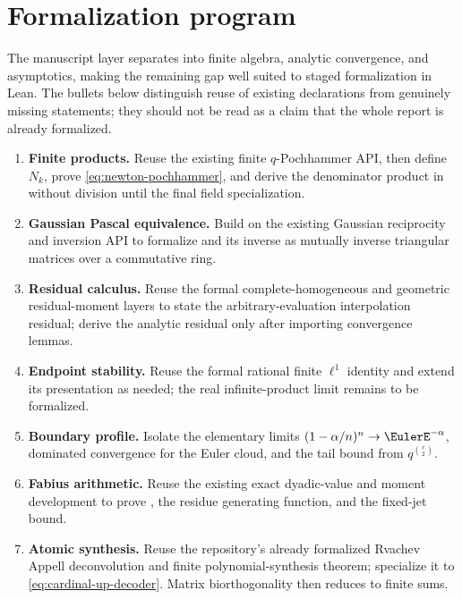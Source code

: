 \documentclass[11pt,oneside]{book}
\numberwithin{equation}{chapter}
\theoremstyle{definition}
\theoremstyle{remark}
\begin{document}
\section{Formalization program}
\label{sec:formalization-program}

The manuscript layer separates into finite algebra, analytic convergence,
and asymptotics, making the remaining gap well suited to staged
formalization in Lean.  The bullets below distinguish reuse of existing
declarations from genuinely missing statements; they should not be read as
a claim that the whole report is already formalized.

\begin{enumerate}
\item \textbf{Finite products.}  Reuse the existing finite $q$-Pochhammer
      API, then define $N_k$, prove
      \eqref{eq:newton-pochhammer}, and derive the denominator product in
       without division until the final
      field specialization.
\item \textbf{Gaussian Pascal equivalence.}  Build on the existing Gaussian
      reciprocity and inversion API to formalize
       and its inverse as mutually inverse
      triangular matrices over a commutative ring.
\item \textbf{Residual calculus.}  Reuse the formal complete-homogeneous and
      geometric residual-moment layers to state the arbitrary-evaluation
      interpolation residual; derive the analytic residual only after
      importing convergence lemmas.
\item \textbf{Endpoint stability.}  Reuse the formal rational finite
      $\ell^1$ identity and extend its presentation as needed; the real
      infinite-product limit remains to be formalized.
\item \textbf{Boundary profile.}  Isolate the elementary limits
      $(1-\alpha/n)^n\to\EulerE^{-\alpha}$, dominated convergence for the Euler
      cloud, and the tail bound from $q^{\binom r2}$.
\item \textbf{Fabius arithmetic.}  Reuse the existing exact dyadic-value and
      moment development to prove , the
      residue generating function, and the fixed-jet bound.
\item \textbf{Atomic synthesis.}  Reuse the repository's already formalized
      Rvachev Appell deconvolution and finite polynomial-synthesis theorem;
      specialize it to \eqref{eq:cardinal-up-decoder}.  Matrix
      biorthogonality then reduces to finite sums.
\end{enumerate}
\end{document}
